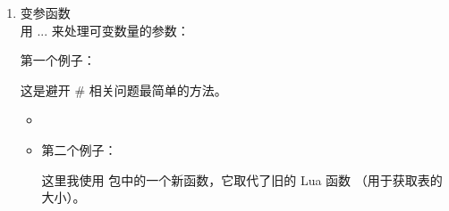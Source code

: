 \begin{enumerate}[label=(\alph*)]
我们来看看函数定义在  宏中的版本。

问题在于使用运算符 \%（取模运算符，整数除法后的余数）。在使用 string.format 函数以及 \%d 或 \%i（整数占位符）时也会遇到同样的问题。

这两种情形的一个解决办法是定义一个宏  来代替 \%。

\begin{verbatim}
 \makeatletter
 \let\pc\@percentchar
 \makeatother
\end{verbatim}

代码变为：


\begin{verbatim}
\directlua{
 function divide_and_remainder(dividend, divisor)
   if divisor == 0 then
     tex.error("Error: Cannot divide by zero")
     return nil
   else
     local quotient = math.floor(dividend / divisor)
     local remainder = dividend \pc divisor
     return quotient, remainder
   end
 end

local num1 = 17
local num2 = 5
local q, r = divide_and_remainder(num1, num2)

tex.sprint(string.format([[The quotient of \pc i divided by
 \pc i is: \pc i\\]], num1, num2, q))
tex.sprint(string.format([[The remainder is: \pc i]], r))}
\end{verbatim}

\item 变参函数\\

用 ... 来处理可变数量的参数：

第一个例子：

这是避开 \# 相关问题最简单的方法。

\begin{itemize}


  \item  \begin{tkzexample}[latex=.2\textwidth]
  \end{tkzexample}


\item  第二个例子：

这里我使用  包中的一个新函数，它取代了旧的 Lua 函数 （用于获取表的大小）。


\end{itemize}
\end{enumerate}
